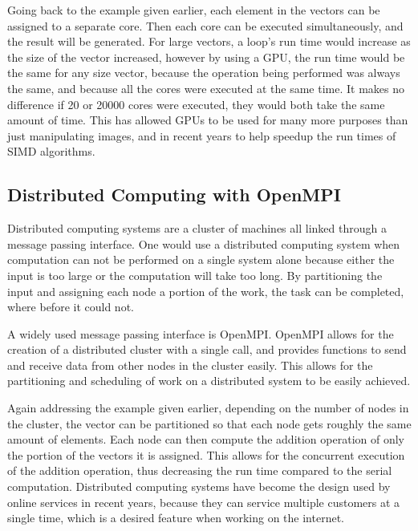 Going back to the example given earlier, each element in the vectors can be assigned to a separate core. Then each core can be executed simultaneously, and the result will be generated. For large vectors, a loop's run time would increase as the size of the vector increased, however by using a GPU, the run time would be the same for any size vector, because the operation being performed was always the same, and because all the cores were executed at the same time. It makes no difference if 20 or 20000 cores were executed, they would both take the same amount of time. This has allowed GPUs to be used for many more purposes than just manipulating images, and in recent years to help speedup the run times of SIMD algorithms.

\subsection{Distributed Computing with OpenMPI}
Distributed computing systems are a cluster of machines all linked through a message passing interface. One would use a distributed computing system when computation can not be performed on a single system alone because either the input is too large or the computation will take too long. By partitioning the input and assigning each node a portion of the work, the task can be completed, where before it could not.

A widely used message passing interface is OpenMPI. OpenMPI allows for the creation of a distributed cluster with a single call, and provides functions to send and receive data from other nodes in the cluster easily. This allows for the partitioning and scheduling of work on a distributed system to be easily achieved.

Again addressing the example given earlier, depending on the number of nodes in the cluster, the vector can be partitioned so that each node gets roughly the same amount of elements. Each node can then compute the addition operation of only the portion of the vectors it is assigned. This allows for the concurrent execution of the addition operation, thus decreasing the run time compared to the serial computation. Distributed computing systems have become the design used by online services in recent years, because they can service multiple customers at a single time, which is a desired feature when working on the internet.